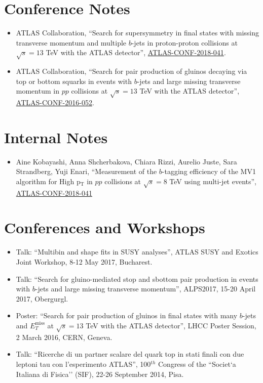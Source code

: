 \documentclass[11pt,a4paper]{moderncv}
\begin{document}
\section{Conference Notes}
\begin{itemize}
\item  ATLAS Collaboration, ``Search for supersymmetry in final states with missing transverse momentum and multiple $b$-jets in proton-proton collisions at $\sqrt{s} = 13$ TeV with the ATLAS detector'', \href{https://cds.cern.ch/record/2632347}{\color{color1}ATLAS-CONF-2018-041}.
\item  ATLAS Collaboration, ``Search for pair production of gluinos decaying via top or bottom squarks in events with $b$-jets and large missing transverse momentum in
$pp$ collisions at $\sqrt{s} = 13$ TeV with the ATLAS detector'', \href{https://atlas.web.cern.ch/Atlas/GROUPS/PHYSICS/CONFNOTES/ATLAS-CONF-2016-052/}{\color{color1}ATLAS-CONF-2016-052}.
\end{itemize}

\section{Internal Notes}
\begin{itemize}
\item  Aine Kobayashi, Anna Shcherbakova, Chiara Rizzi, Aurelio Juste, Sara Strandberg, Yuji Enari, ``Measurement of the $b$-tagging efficiency of the MV1 algorithm for High p$_\mathrm{T}$ in $pp$ collisions at $\sqrt{s} = 8$ TeV using multi-jet events'', \href{https://cds.cern.ch/record/2032163}{\color{color1}ATLAS-CONF-2018-041}
\end{itemize}

\section{Conferences and Workshops}
\begin{itemize}
\item Talk: ``Multibin and shape fits in SUSY analyses'', ATLAS SUSY and Exotics Joint Workshop, 8-12 May 2017, Bucharest.
\item Talk: ``Search for gluino-mediated stop and sbottom pair production in events with $b$-jets and large missing transverse momentum'', ALPS2017, 15-20 April 2017, Obergurgl.
\item Poster: ``Search for pair production of gluinos in final states with many $b$-jets and $E_T^{\mathrm{miss}}$ at $\sqrt{s}=13$ TeV with the ATLAS detector'', LHCC Poster Session, 2 March 2016, CERN, Geneva.
\item Talk: ``Ricerche di un partner scalare del quark top in stati finali con due leptoni tau con l'esperimento ATLAS'', 100$^{th}$ Congress of the “Societ`a Italiana di Fisica'' (SIF), 22-26 September 2014, Pisa.
\end{itemize}
\end{document}

